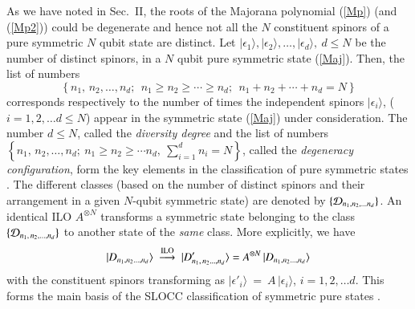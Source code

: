 As we have noted in Sec.~II,  the roots of the Majorana polynomial (\ref{Mp}) (and (\ref{Mp2})) could be degenerate  and hence not all the  $N$ constituent spinors of a pure symmetric $N$ qubit state are distinct. Let $\vert \epsilon_1\rangle, \vert \epsilon_2\rangle,\ldots, \vert \epsilon_d\rangle,\ d\leq N$ be the number of distinct spinors, in a $N$ qubit pure symmetric state (\ref{Maj}).  Then, the list of numbers 
$$
\left\{n_1,\,n_2,\ldots ,n_d;\ \ n_1\geq n_2\geq\cdots \geq n_d; \ \  n_1+n_2+\cdots+n_d=N\right\}
$$ 
corresponds respectively to the number of times the independent spinors $\vert\epsilon_i\rangle$, ($i=1,2,\ldots d\leq N$) appear in the symmetric state (\ref{Maj}) under consideration. The number $d\leq N$, called the {\em diversity degree} and the list of numbers $\left\{n_1,\,n_2,\ldots ,n_d;\  n_1\geq n_2\geq \cdots n_d,\  \sum_{i=1}^{d} n_i=N\right\}$, called the {\em degeneracy configuration}, form the key elements in the classification of  pure symmetric states \cite{solano}. The different classes  (based on the number of distinct spinors and their arrangement in a given $N$-qubit symmetric state)  are denoted by $\{{\cal D}_{n_1,n_2,\ldots n_d}\}$. An identical ILO $A^{\otimes N}$ transforms a symmetric state belonging to the class $\{ {\cal D}_{n_1,\,n_2,\ldots, n_d}\}$ to another state of the {\em same} class. More explicitly, we have 
\begin{equation}
\vert D_{n_1,n_2\ldots, n_d}\rangle \ \stackrel{\rm  ILO}{\longrightarrow}\ \vert D'_{n_1,\,n_2\ldots, n_d}\rangle={A}^{\otimes N}\,\vert D_{n_1,n_2\ldots, n_d}\rangle\label{chap29-eq12}
\end{equation}  
with the constituent spinors transforming as 
$\vert\epsilon'_i\rangle~=~A\, \vert\epsilon_i\rangle$, $i=1,2,\ldots d$. This forms the main basis of the SLOCC classification of symmetric pure 
states \cite{solano}. 
